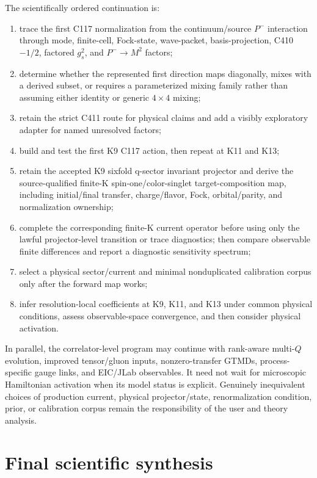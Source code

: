 \documentclass[11pt,oneside]{book}
\begin{document}
The scientifically ordered continuation is:
\begin{enumerate}[label=\textbf{Step \arabic*:}]
 \item trace the first C117 normalization from the continuum/source $P^-$ interaction through mode, finite-cell, Fock-state, wave-packet, basis-projection, C410 $-1/2$, factored $g_s^2$, and $P^-\to M^2$ factors;
 \item determine whether the represented first direction maps diagonally, mixes with a derived subset, or requires a parameterized mixing family rather than assuming either identity or generic $4\times4$ mixing;
 \item retain the strict C411 route for physical claims and add a visibly exploratory adapter for named unresolved factors;
 \item build and test the first K9 C117 action, then repeat at K11 and K13;
 \item retain the accepted K9 sixfold q-sector invariant projector and derive the source-qualified finite-K spin-one/color-singlet target-composition map, including initial/final transfer, charge/flavor, Fock, orbital/parity, and normalization ownership;
 \item complete the corresponding finite-K current operator before using only the lawful projector-level transition or trace diagnostics; then compare observable finite differences and report a diagnostic sensitivity spectrum;
 \item select a physical sector/current and minimal nonduplicated calibration corpus only after the forward map works;
 \item infer resolution-local coefficients at K9, K11, and K13 under common physical conditions, assess observable-space convergence, and then consider physical activation.
\end{enumerate}
In parallel, the correlator-level program may continue with rank-aware multi-$Q$ evolution, improved tensor/gluon inputs, nonzero-transfer GTMDs, process-specific gauge links, and EIC/JLab observables.  It need not wait for microscopic Hamiltonian activation when its model status is explicit.  Genuinely inequivalent choices of production current, physical projector/state, renormalization condition, prior, or calibration corpus remain the responsibility of the user and theory analysis.

\section{Final scientific synthesis}
\end{document}
